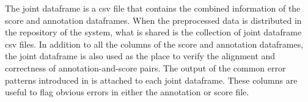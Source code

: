 
The joint dataframe is a \gls{csv} file that contains the
combined information of the score and annotation dataframes.
When the preprocessed data is distributed in the repository
of the system, what is shared is the collection of joint
dataframe \gls{csv} files. In addition to all the columns of
the score and annotation dataframes, the joint dataframe is
also used as the place to verify the alignment and
correctness of annotation-and-score pairs. The output of the
common error patterns introduced in
 is attached to each joint
dataframe. These columns are useful to flag obvious errors
in either the annotation or score file.
